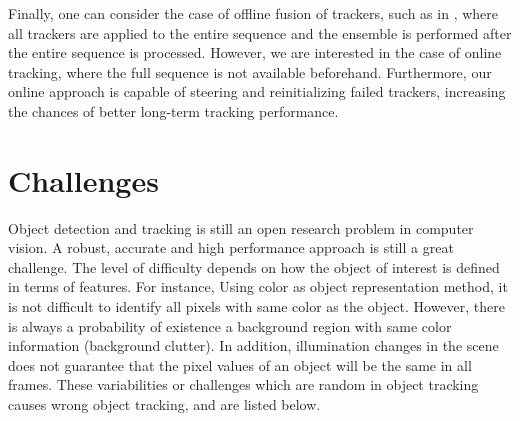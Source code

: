 
Finally, one can consider the case of offline fusion of trackers, such as in
\cite{Bailer2014}, where all trackers are applied to the entire sequence
and the ensemble is performed after the entire sequence is processed.
However, we are interested in the case of online tracking,
where the full sequence is not available beforehand. Furthermore, our online
approach is capable of steering and reinitializing failed trackers, increasing
the chances of better long-term tracking performance.


\section{Challenges}

Object detection and tracking is still an open research problem in computer vision. A robust, accurate and high performance approach is still a great challenge. The level of difficulty depends on how the object of interest is defined in terms of features. For instance, Using color as object representation method, it is not difficult to identify all pixels with same color as the object. However, there is always a probability of existence a background region with same color information (background clutter). In addition, illumination changes in the scene does not guarantee that the pixel values of an object will be the same in all frames. These variabilities or challenges which are random in object tracking causes wrong object tracking, and are listed below.

